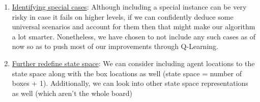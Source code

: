 \documentclass{article}
\begin{document}
\begin{enumerate}
    \item \underline{Identifying special cases}: Although including a special instance can be very risky in case it fails on higher levels, if we can confidently deduce some universal scenarios and account for them then that might make our algorithm a lot smarter. Nonetheless, we have chosen to not include any such cases as of now so as to push most of our improvements through Q-Learning. 
    \item \underline{Further redefine state space}: We can consider including agent locations to the state space along with the box locations as well (state space = number of boxes + 1). Additionally, we can look into other state space representations as well (which aren't the whole board)   
\end{enumerate}

\end{document}
